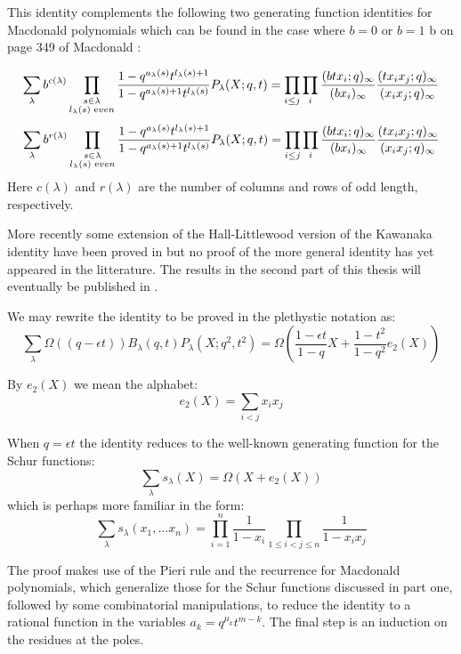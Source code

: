 \documentclass[12pt,dvips]{amsart}
\begin{document}
\medskip
This identity complements the following two generating function identities for Macdonald polynomials which can be found in the case where $b=0$ or $b=1$ b on page 349 of Macdonald \cite{BLACK}:

$$ \sum_\lambda b^{c(\lambda)} \prod_{\substack{s \in \lambda \\ l_\lambda(s) \,\, {\text even}}}\frac{1- q^{a_\lambda(s)}t^{l_\lambda(s) + 1}}{1 - q^{a_\lambda(s) + 1} t^{l_\lambda(s)}}P_\lambda(X;q,t) = \prod_{i \leq j} \prod_i \frac{(btx_i;q)_\infty}{(bx_i)_\infty} \frac{(t x_i x_j ; q)_\infty}{(x_i x_j; q)_\infty} $$
$$ \sum_\lambda b^{r(\lambda)} \prod_{\substack{s \in \lambda \\ l_\lambda(s) \,\, {\text even}}}\frac{1- q^{a_\lambda(s)}t^{l_\lambda(s) + 1}}{1 - q^{a_\lambda(s) + 1} t^{l_\lambda(s)}} P_\lambda(X;q,t) = \prod_{i \leq j} \prod_i \frac{(btx_i;q)_\infty}{(bx_i)_\infty} \frac{(t x_i x_j ; q)_\infty}{(x_i x_j; q)_\infty} $$
Here $c(\lambda)$ and $r(\lambda)$ are the number of columns and rows of odd length, respectively.

\medskip

More recently some extension of the Hall-Littlewood version of the Kawanaka identity have been proved in \cite{KAWAHALL} but no proof of the more general identity has yet appeared in the litterature. The results in the second part of this thesis will eventually be published in \cite{WARNAAR}.

\medskip

We may rewrite the identity to be proved in the plethystic notation as:
$$ \sum_\lambda \Omega ( (q - \epsilon t)) B_\lambda(q,t) P_\lambda(X; q^2, t^2) = \Omega \left ( \frac{1 - \epsilon t}{1-q} X + \frac{1 - t^2}{1 - q^2} e_2(X) \right ) $$

\medskip
\noindent
By $e_2(X)$ we mean the alphabet:
$$ e_2(X) = \sum_{i < j} x_i x_j $$

\noindent
When $q=\epsilon t$ the identity reduces to the well-known generating function for the Schur functions:
$$ \sum_\lambda s_\lambda(X) = \Omega \left ( X + e_2(X) \right ) $$
which is perhaps more familiar in the form:
$$ \sum_\lambda s_\lambda(x_1, \ldots x_n) = \prod_{i = 1}^n \frac{1}{1-x_i} \prod_{1 \leq i < j \leq n} \frac{1}{1-x_i x_j} $$



\medskip
\noindent
The proof makes use of the Pieri rule and the recurrence for Macdonald polynomials, which generalize those for the Schur functions discussed in part one, followed by some combinatorial manipulations, to reduce the identity to a rational function in the variables $a_k = q^{\mu_k} t^{m - k}$. The final step is an induction on the residues at the poles.
\end{document}
